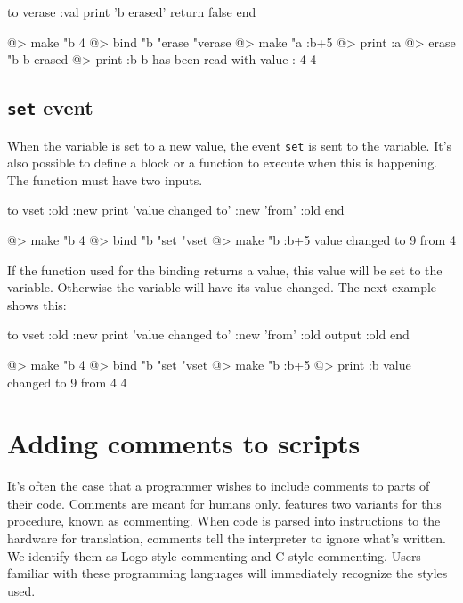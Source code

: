 \begin{verbatimtab}
to verase :val
	print 'b erased'
	return false
end

@> make "b 4
@> bind "b "erase "verase
@> make "a :b+5
@> print :a
@> erase "b
b erased
@> print :b
b has been read with value : 4
4
\end{verbatimtab}

\subsection{{\tt set} event}

When the variable is set to a new value, the event {\tt set} is sent to the variable. It's also possible to define a block or a function to execute when this is happening. The function must have two inputs.

\begin{verbatimtab}
to vset :old :new
	print 'value changed to' :new 'from' :old
end

@> make "b 4
@> bind "b "set "vset
@> make "b :b+5
value changed to 9 from 4
\end{verbatimtab}

If the function used for the binding returns a value, this value will be set to the variable.  Otherwise the variable will have its value changed. The next example shows this:

\begin{verbatimtab}
to vset :old :new
	print 'value changed to' :new 'from' :old
	output :old
end

@> make "b 4
@> bind "b "set "vset
@> make "b :b+5
@> print :b
value changed to 9 from 4
4
\end{verbatimtab}

\section{Adding comments to scripts} 
 
It's often the case that a programmer wishes to include comments to parts of their code.  Comments are meant for humans only. \squirrel features two variants for this procedure, known as commenting.  When code is parsed into instructions to the hardware for translation, comments tell the interpreter to ignore what's written.  We identify them as Logo-style commenting and C-style commenting.  Users familiar with these programming languages will immediately recognize the styles used.\\ 


